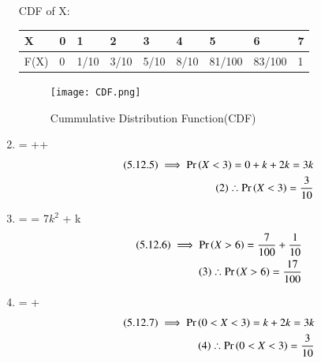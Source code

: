 \documentclass[journal,12pt,twocolumn]{IEEEtran}
\begin{document}
\begin{enumerate}
 CDF of X:
 \begin{table}[h]
\begin{tabular}{|l|l|l|l|l|l|l|l|l|}
\hline
X    & 0 & 1    & 2    & 3    & 4    & 5      & 6      & 7 \\ \hline
F(X) & 0 & 1/10 & 3/10 & 5/10 & 8/10 & 81/100 & 83/100 & 1 \\ \hline
\end{tabular}
\end{table}
\begin{figure}[!htb]
    \centering    
	\texttt{[image: CDF.png]}
    \caption{Cummulative Distribution Function(CDF)}
\end{figure}
 
\item {} = ++
 \begin{align}
\tag{5.12.5}
\implies  \Pr\left(X < 3\right) = 0 + k + 2k = 3k \\
\tag{2}
\therefore  \Pr\left(X < 3\right) = \frac{3}{10} 
   \end{align} 
 \item {} =  = 7$k^2$ + k 
 \begin{align}
\tag{5.12.6}
\implies  \Pr\left(X > 6\right)  = \frac{7}{100} + \frac{1}{10} \\
\tag{3}
\therefore \Pr\left(X > 6\right) = \frac{17}{100} 
\end{align}
\item {} =  +   
\begin{align}
 \tag{5.12.7}
              \implies   \Pr\left(0 < X < 3\right) = k + 2k = 3k\\
\tag{4}              
    \therefore    \Pr\left(0 < X < 3\right) = \frac{3}{10}
\end{align}

\end{enumerate}
\end{document}
